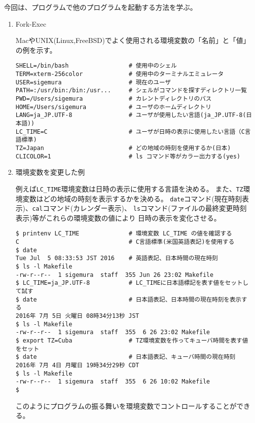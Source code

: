 \documentclass[a4j,dvipdfmx]{jarticle}
\begin{document}
\def\lstlistingname{リスト}


今回は、プログラムで他のプログラムを起動する方法を学ぶ。

\begin{enumerate}
\item Fork-Exec

MacやUNIX(Linux,FreeBSD)でよく使用される環境変数の「名前」と「値」の例を示す。
\begin{lstlisting}[numbers=none]
SHELL=/bin/bash                 # 使用中のシェル
TERM=xterm-256color             # 使用中のターミナルエミュレータ
USER=sigemura                   # 現在のユーザ
PATH=:/usr/bin:/bin:/usr...     # シェルがコマンドを探すディレクトリ一覧
PWD=/Users/sigemura             # カレントディレクトリのパス
HOME=/Users/sigemura            # ユーザのホームディレクトリ
LANG=ja_JP.UTF-8                # ユーザが使用したい言語(ja_JP.UTF-8(日本語))
LC_TIME=C                       # ユーザが日時の表示に使用したい言語（C言語標準)
TZ=Japan                        # どの地域の時刻を使用するか(日本)
CLICOLOR=1                      # ls コマンド等がカラー出力する(yes)
\end{lstlisting}

\item 環境変数を変更した例

例えば\verb/LC_TIME/環境変数は日時の表示に使用する言語を決める。
また、\verb/TZ/環境変数はどの地域の時刻を表示するかを決める。
\verb/date/コマンド(現在時刻表示)、\verb/cal/コマンド(カレンダー表示)、
\verb/ls/コマンド(ファイルの最終変更時刻表示)等がこれらの環境変数の値により
日時の表示を変化させる。
\begin{lstlisting}[numbers=none]
$ printenv LC_TIME              # 環境変数 LC_TIME の値を確認する
C                               # C言語標準(米国英語表記)を使用する
$ date
Tue Jul  5 08:33:53 JST 2016    # 英語表記、日本時間の現在時刻
$ ls -l Makefile 
-rw-r--r--  1 sigemura  staff  355 Jun 26 23:02 Makefile
$ LC_TIME=ja_JP.UTF-8           # LC_TIMEに日本語標記を表す値をセットして試す
$ date                          # 日本語表記、日本時間の現在時刻を表示する
2016年 7月 5日 火曜日 08時34分13秒 JST
$ ls -l Makefile 
-rw-r--r--  1 sigemura  staff  355  6 26 23:02 Makefile
$ export TZ=Cuba                # TZ環境変数を作ってキューバ時間を表す値をセット
$ date                          # 日本語表記、キューバ時間の現在時刻
2016年 7月 4日 月曜日 19時34分29秒 CDT
$ ls -l Makefile 
-rw-r--r--  1 sigemura  staff  355  6 26 10:02 Makefile
$
\end{lstlisting}
このようにプログラムの振る舞いを環境変数でコントロールすることができる。


\end{enumerate}
\end{document}
